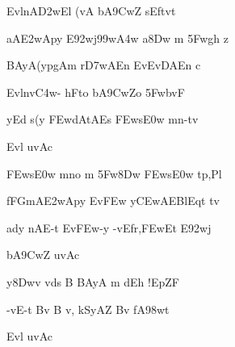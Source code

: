 {\dn Evl\?nA\3D2wEl\2 (vA b\5A\39CwZ s\2Eftv\5t \vegdn\dontdisplaylinenum}

{\dn aA\3E2wApy E\392wj\399w\?\3A4w a\38Dw m\? \35Fwg\5h\2 z{\dandabdn} \dontdisplaylinenum}

{\dn BAyA\0(ypg\5Am r\3D7wAEn EvEvDAEn c \vegdn\dontdisplaylinenum}

{\dn Evl\?n\4v\3C4w- hFto b\5A\39CwZo \35Fwb\5vF \dontdisplaylinenum}

{\dn yEd s(y\2 \3FEwdAtAEs \3FEws\3E0w\2 mn-tv \vegdn\dontdisplaylinenum}

{\dn Evl uvAc{\dandabdn}\dontdisplaylinenum }

{\dn {}\3FEws\3E0w\2 mno m\? \35Fw\38Dw \3FEws\3E0w\2 tp,Pl \dontdisplaylinenum}

{\dn fFG\5mA\3E2wApy Ev\3FEw y\3CEwAEBlEqt\2 tv{\dandadn}\dontdisplaylinenum }

{\dn ad\?y\2 nAE-t Ev\3FEw-y -vEfr,\3FEwEt E\392wj \vegdn\dontdisplaylinenum}

{\dn b\5A\39CwZ uvAc{\dandabdn}\dontdisplaylinenum }

{\dn y\38Dw\?v\2 vds\? B BAyA{\rdt} m\? d\?Eh !EpZF \dontdisplaylinenum}

{\dn -vE-t Bv B\2 v, kSyAZ\2 Bv fA\398wt \vegdn\dontdisplaylinenum}

{\dn Evl uvAc{\dandabdn}\dontdisplaylinenum }

